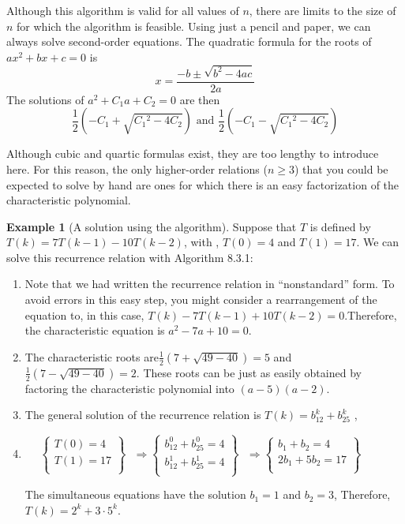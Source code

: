 \documentclass[10pt,]{book}
\theoremstyle{plain}
\theoremstyle{definition}
\theoremstyle{definition}
\theoremstyle{definition}
\newtheorem{example}[theorem]{Example}
\theoremstyle{definition}
\numberwithin{equation}{section}
\begin{document}
\par
Although this algorithm is valid for all values of \(n\), there are limits to the size of \(n\) for which the algorithm is feasible. Using just a pencil and paper, we can always solve second-order equations. The quadratic formula for the roots of \(a x^2 + b x + c = 0\) is
\[x=\frac{-b\pm \sqrt{b^2-4 a c}}{2 a}\]
The solutions of \(a^2+ C_1a + C_2 = 0\) are then
\[\frac{1}{2}\left(-C_1+\sqrt{C_1{}^2-4 C_2}\right)\textrm{ and }\frac{1}{2}\left(-C_1-\sqrt{C_1{}^2-4 C_2}\right)\]
%
\par
Although cubic and quartic formulas exist, they are too lengthy to introduce here. For this reason, the only higher-order relations (\(n\geq 3\))
that you could be expected to solve by hand are ones for which there is an easy factorization of the characteristic polynomial.%
\begin{example}[A solution using the algorithm]\label{ex-hrr-solution-example-1}
 Suppose that \(T\) is defined by \(T(k) =7T(k-1)-10T(k-2)\), with , \(T(0) = 4\) and \(T(1) = 17\). We can solve this
recurrence relation with Algorithm 8.3.1:%
\par
\leavevmode%
\begin{enumerate}[label=\alph*]
\item\hypertarget{li-38}{}Note that we had written the recurrence relation in ``nonstandard'' form. To avoid errors in this easy step, you might consider a rearrangement
of the equation to, in this case, \(T(k) -7T(k-1)+10T(k-2)=0\).Therefore, the characteristic equation is \(a^2 -7a + 10 = 0\). %
\item\hypertarget{li-39}{} The characteristic roots are\(\frac{1}{2}\left(7+\sqrt{49-40}\right)=5\) and \(\frac{1}{2}\left(7-\sqrt{49-40}\right)=2\). These roots can be
just as easily obtained by factoring the characteristic polynomial into \((a - 5)(a - 2)\).%
\item\hypertarget{li-40}{}The general solution of the recurrence relation is \(T(k) =b_12^k+ b_25^k\) ,%
\item\hypertarget{li-41}{} \(\quad\) \(\left\{
\begin{array}{c}
 T(0)=4 \\
 T(1)=17 \\
\end{array}
\right\}\textrm{  }\Rightarrow \left\{
\begin{array}{c}
 b_12^0+b_25^0=4 \\
 b_12^1+b_25^1=4 \\
\end{array}
\right\}\textrm{  }\Rightarrow \left\{
\begin{array}{c}
 b_1+b_2=4 \\
 2b_1+5b_2=17 \\
\end{array}
\right\}\textrm{  }\)

The simultaneous equations have the solution \(b_1=1\) and \(b_2=3\), Therefore, \(T(k)=2^{k }+3\cdot 5^k\).%
\end{enumerate}
%
\end{example}
\end{document}
